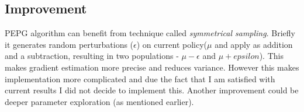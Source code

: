 \documentclass[12pt]{article}
\begin{document}
\subsection{Improvement}

PEPG algorithm can benefit from technique called \emph{symmetrical sampling}. Briefly it generates random perturbations ($\epsilon$) on current policy($\mu$ and apply as addition and a subtraction, resulting in two populations - $\mu - \epsilon$ and $\mu + epsilon$). This makes gradient estimation more precise and reduces variance. However this makes implementation more complicated and due the fact that I am satisfied with current results I did not decide to implement this. Another improvement could be deeper parameter exploration (as mentioned earlier).


\newpage


 
\end{document}
